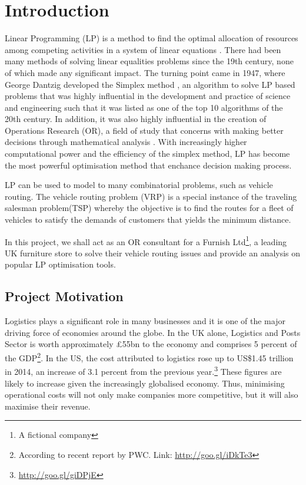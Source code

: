 \chapter{Introduction}
Linear Programming (LP) is a method to find the optimal allocation of resources among competing activities
in a system of linear equations \cite{APMBradley}. There had been many methods of solving linear equalities
problems since the 19th century, none of which made any significant impact. The turning point came in 1947, where George Dantzig
developed the Simplex method \cite{wiki:SA}, an algorithm to solve LP based problems that was highly influential in the development and practice of science and engineering such that it was
listed as one of the top 10 algorithms of the 20th century. In addition, it was also highly influential in the creation
 of Operations Research (OR), a field of study that concerns with making better decisions through mathematical analysis \cite{wiki:OR}.
 With increasingly higher computational power and
the efficiency of the simplex method, LP has become the most powerful optimisation method that enchance decision making
process.

LP can be used to model to many combinatorial problems, such as vehicle routing.
The vehicle routing problem (VRP) is a special instance of the traveling salesman problem(TSP) \cite{Dantzig1959} whereby the objective
is to find the routes for a fleet of vehicles to satisfy the demands of customers that yields the minimum distance.

In this project, we shall act as an OR consultant for a Furnish Ltd\footnote{A fictional company}, a leading UK furniture store to solve their vehicle
routing issues and provide an analysis on popular LP optimisation tools.

\section{Project Motivation}
Logistics plays a significant role in many businesses and it is one of the major
driving force of economies around the globe. In the UK alone, Logistics and Posts Sector is worth approximately
\pounds55bn to the economy and comprises 5 percent of the GDP\footnote{According to recent report by PWC. Link: \url{http://goo.gl/iDkTe3}}.
In the US, the cost attributed to logistics rose up to US\$1.45 trillion in 2014, an increase of 3.1 percent from the previous year.\footnote{\url{http://goo.gl/giDPjE}}
These figures are likely to increase given the increasingly globalised economy. Thus, minimising operational costs will not only make companies
more competitive, but it will also maximise their revenue.

